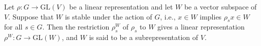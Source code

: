 Let $\rho: G \to \mathrm{GL}(V)$ be a linear representation and let $W$ be a vector subspace of $V$.
Suppose that $W$ is stable under the action of $G$, i.e., $x \in W$ implies $\rho_s x \in W$ for all $s \in G$.
Then the restriction $\rho_s^W$ of $\rho_s$ to $W$ gives a linear representation $\rho^W: G \to \mathrm{GL}(W)$, and $W$ is said to be a subrepresentation of $V$.
